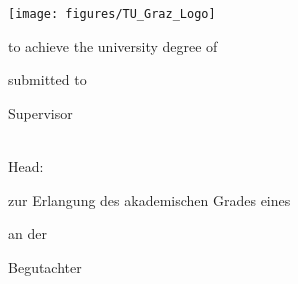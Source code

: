 
\begin{titlepage}

{\sffamily

\begin{center}

\texttt{[image: figures/TU\_Graz\_Logo]}

\vfill\vfill\vfill
\vfill\vfill\vfill

\myauthorwithexistingtitles

\vfill\vfill\vfill

{\LARGE\bfseries\mytitle}


\vfill\vfill\vfill
\vfill\vfill\vfill


{\bfseries\large\myworktitle}

{%
to achieve the university degree of

\mygrade

\mydegreeprogramme


\vfill\vfill\vfill


submitted to

\vfill

{\bfseries\large\myuniversity}


\vfill\vfill\vfill


Supervisor

\mysupervisor

\vfill

\myinstitute\\
Head: \myinstitutehead\\
}
{%
zur Erlangung des akademischen Grades eines

\mygrade

\mydegreeprogramme


\vfill\vfill\vfill


an der

\vfill

{\bfseries\large\myuniversity}


\vfill\vfill\vfill


Begutachter

}
\end{center}}
\end{titlepage}

